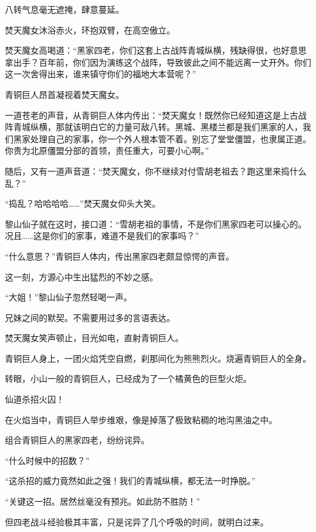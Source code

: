 
\begin{this_body}



八转气息毫无遮掩，肆意蔓延。

焚天魔女沐浴赤火，环抱双臂，在高空傲立。

焚天魔女高喝道：“黑家四老，你们这套上古战阵青城纵横，残缺得很，也好意思拿出手？百年前，你们因为演练这个战阵，导致彼此之间不能远离一丈开外。你们这一次舍得出来，谁来镇守你们的福地大本营呢？”

青铜巨人昂首凝视着焚天魔女。

一道苍老的声音，从青铜巨人体内传出：“焚天魔女！既然你已经知道这是上古战阵青城纵横，那就该明白它的力量可敌八转。黑城、黑楼兰都是我们黑家的人，我们黑家处理自己的家事，你一个外人根本管不着。别忘了堂堂僵盟，也隶属正道。你贵为北原僵盟分部的首领，责任重大，可要小心啊。”

随后，又有一道声音道：“焚天魔女，你不继续对付雪胡老祖去？跑这里来捣什么乱？”

“捣乱？哈哈哈哈……”焚天魔女仰头大笑。

黎山仙子就在这时，接口道：“雪胡老祖的事情，不是你们黑家四老可以操心的。况且……这是你们的家事，难道不是我们的家事吗？”

“什么意思？”青铜巨人体内，传出黑家四老颇显惊愕的声音。

这一刻，方源心中生出猛烈的不妙之感。

“大姐！”黎山仙子忽然轻喝一声。

兄妹之间的默契。不需要用过多的言语表达。

焚天魔女笑声顿止，目光如电，直射青铜巨人。

青铜巨人身上，一团火焰凭空自燃，刹那间化为熊熊烈火。烧遍青铜巨人的全身。

转眼，小山一般的青铜巨人，已经成为了一个橘黄色的巨型火炬。

仙道杀招火囚！

在火焰当中，青铜巨人举步维艰，像是掉落了极致粘稠的地沟黑油之中。

组合青铜巨人的黑家四老，纷纷诧异。

“什么时候中的招数？”

“这杀招的威力竟然如此之强！我们的青城纵横，都无法一时挣脱。”

“关键这一招。居然丝毫没有预兆。如此防不胜防！”

但四老战斗经验极其丰富，只是诧异了几个呼吸的时间，就明白过来。


\end{this_body}
